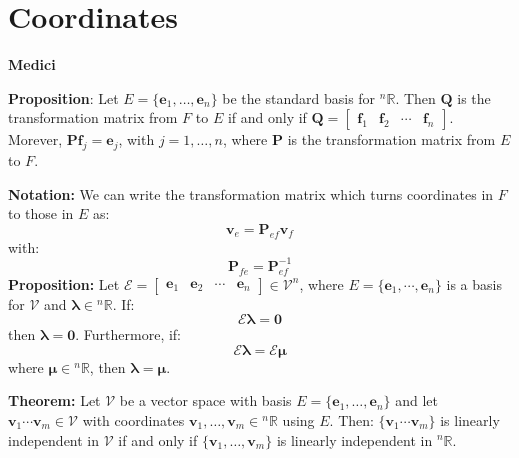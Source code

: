 \documentclass{article}
\newcommand{\bff}[1]{\mathbf{#1}}
\begin{document}
    \section{Coordinates}
    \begin{minipage}[t]{.45\textwidth}
    \begin{center}
        \textbf{Medici}
    \end{center}
    \textbf{Proposition}: Let $E = \{\bff{e}_1, \dots, \bff{e}_n\}$ be the standard basis for ${^n}\mathbb{R}$. Then $\bff{Q}$ is the transformation matrix from $F$ to $E$ if and only if $\bff{Q} = \begin{bmatrix}
        \bff{f}_1 & \bff{f}_2 & \cdots & \bff{f}_n
    \end{bmatrix}.$ Morever, $\bff{Pf}_j = \bff{e}_j$, with $j=1,\dots,n$, where $\bff{P}$ is the transformation matrix from $E$ to $F$.
    \vspace{2mm}

    \textbf{Notation:} We can write the transformation matrix which turns coordinates in $F$ to those in $E$ as:
    \begin{equation*}
        \bff{v}_e = \bff{P}_{ef} \bff{v}_f
    \end{equation*}
    with:
    \begin{equation*}
        \bff{P}_{fe} = \bff{P}_{ef}^{-1}
    \end{equation*}
    \textbf{Proposition:} Let $\bm{\mathcal{E}} = \begin{bmatrix}
        \bm{e}_1 & \bff{e}_2 & \cdots & \bff{e}_n
    \end{bmatrix} \in \mathcal{V}^n$, where $E = \{\bm{e}_1, \cdots, \bm{e}_n\}$ is a basis for $\mathcal{V}$ and $\bm{\lambda} \in {^n}\mathbb{R}.$ If:
    \begin{equation*}
        \bm{\mathcal{E}\lambda}= \bm{0}
    \end{equation*}
    then $\bm{\lambda}=\bff{0}$. Furthermore, if:
    \begin{equation*}
        \bm{\mathcal{E}\lambda} = \bm{\mathcal{E}\mu}
    \end{equation*}
    where $\bm{\mu} \in {^n}\mathbb{R}$, then $\bm{\lambda}=\bm{\mu}.$
    \vspace{2mm}

    \textbf{Theorem:} Let $\mathcal{V}$ be a vector space with basis $E=\{\bm{e}_1, \dots, \bm{e}_n\}$ and let $\bm{v}_1 \cdots \bm{v}_m \in \mathcal{V}$ with coordinates $\bff{v}_1, \dots, \bff{v}_m \in {^n}\mathbb{R}$ using $E$. Then: $\{\bm{v}_1 \cdots \bm{v}_m\}$ is linearly independent in $\mathcal{V}$ if and only if $\{\bff{v}_1, \dots, \bff{v}_m\}$ is linearly independent in ${^n}\mathbb{R}$.
    \end{minipage}
\end{document}

